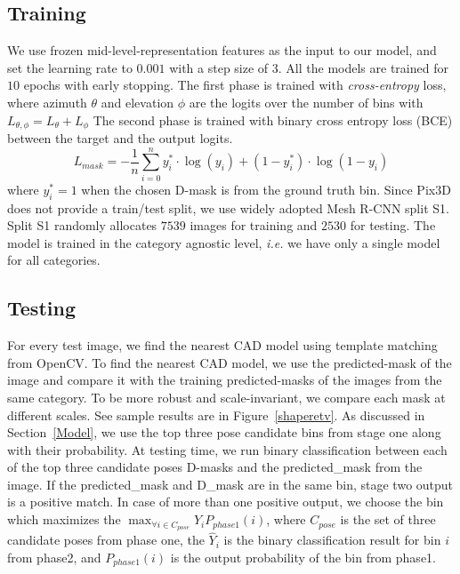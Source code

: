 \documentclass[letterpaper, 10 pt, conference]{ieeeconf}  \pdfoutput=1
\begin{document}
\subsection{Training} 
We use frozen mid-level-representation features as the input to our model,
and set the learning rate to $0.001$ with a step size of $3$. All the models are trained for $10$ epochs with early stopping. The first phase is trained with {\em cross-entropy} loss, where azimuth $\theta$ and elevation $\phi$ are the logits over the number of bins with 
$L_{\theta, \phi}=L_{\theta}+L_{\phi}$
The second phase is trained with binary cross entropy loss (BCE) between the target and the output logits.
$$
L_{mask}=-\frac {1}{n} \sum_{i=0}^{n} y_{i}^* \cdot \log \left (y_{i}\right )+\left (1-y_{i}^*\right ) \cdot \log \left(1-{y}_{i}\right )
$$
where $y_i^* = 1$ when the chosen
D-mask is from the ground truth bin.
Since Pix3D does not provide a train/test split, we use widely adopted Mesh R-CNN split S1. Split S1 randomly allocates $7539$ images for training and $2530$ for testing. The model is trained in the category agnostic level, 
{\em i.e.} we have only a single model for all categories.

\subsection{Testing} 
For every test image, we find the nearest CAD model using template matching from OpenCV. To find the nearest CAD model, we use the predicted-mask of the image and compare it with the training predicted-masks of the images from the same category. To be more robust and scale-invariant, we compare each mask at different scales. See sample results are in Figure~\ref{shaperetv}.
As discussed in Section~\ref{Model}, we use the top three pose candidate bins from stage one along with their probability. At testing time, we run binary classification between each of the top three candidate poses D-masks and the predicted\_mask from the image. If the predicted\_mask and D\_mask are in the same bin, stage two output is a positive match. In case of more than one positive output, we choose the bin which maximizes the $\max_{\forall i \in C_{pose}}{\hat{Y}_i P_{phase1}({i})}$, where $C_{pose}$ is the set of three candidate poses from phase one, the $\hat{Y}_i$ is the binary classification result for bin $i$ from phase2, and $P_{phase1}({i})$ is the output probability of the bin from phase1. 
\end{document}
